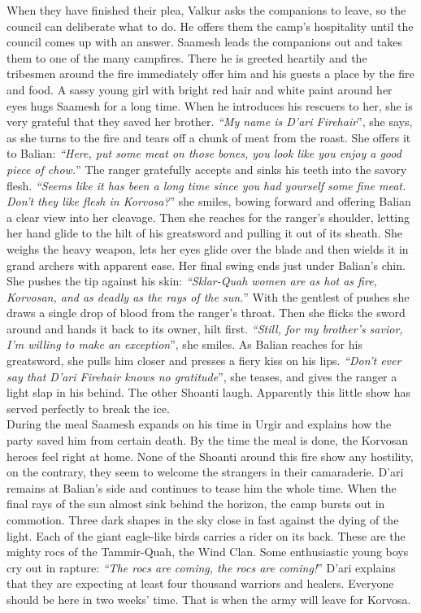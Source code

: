 When they have finished their plea, Valkur asks the companions to leave, so the council can deliberate what to do. He offers them the camp's hospitality until the council comes up with an answer. Saamesh leads the companions out and takes them to one of the many campfires. There he is greeted heartily and the tribesmen around the fire immediately offer him and his guests a place by the fire and food. A sassy young girl with bright red hair and white paint around her eyes hugs Saamesh for a long time. When he introduces his rescuers to her, she is very grateful that they saved her brother. {\itshape``My name is D'ari Firehair}'', she says, as she turns to the fire and tears off a chunk of meat from the roast. She offers it to Balian: {\itshape``Here, put some meat on those bones, you look like you enjoy a good piece of chow.}'' The ranger gratefully accepts and sinks his teeth into the savory flesh. {\itshape``Seems like it has been a long time since you had yourself some fine meat. Don't they like flesh in Korvosa?}'' she smiles, bowing forward and offering Balian a clear view into her cleavage. Then she reaches for the ranger's shoulder, letting her hand glide to the hilt of his greatsword and pulling it out of its sheath. She weighs the heavy weapon, lets her eyes glide over the blade and then wields it in grand archers with apparent ease. Her final swing ends just under Balian's chin. She pushes the tip against his skin: {\itshape``Sklar-Quah women are as hot as fire, Korvosan, and as deadly as the rays of the sun.}'' With the gentlest of pushes she draws a single drop of blood from the ranger's throat. Then she flicks the sword around and hands it back to its owner, hilt first. {\itshape``Still, for my brother's savior, I'm willing to make an exception}'', she smiles. As Balian reaches for his greatsword, she pulls him closer and presses a fiery kiss on his lips. {\itshape``Don't ever say that D'ari Firehair knows no gratitude}'', she teases, and gives the ranger a light slap in his behind. The other Shoanti laugh. Apparently this little show has served perfectly to break the ice.\\

During the meal Saamesh expands on his time in Urgir and explains how the party saved him from certain death. By the time the meal is done, the Korvosan heroes feel right at home. None of the Shoanti around this fire show any hostility, on the contrary, they seem to welcome the strangers in their camaraderie. D'ari remains at Balian's side and continues to tease him the whole time. When the final rays of the sun almost sink behind the horizon, the camp bursts out in commotion. Three dark shapes in the sky close in fast against the dying of the light. Each of the giant eagle-like birds carries a rider on its back. These are the mighty rocs of the Tammir-Quah, the Wind Clan. Some enthusiastic young boys cry out in rapture: {\itshape``The rocs are coming, the rocs are coming!}'' D'ari explains that they are expecting at least four thousand warriors and healers. Everyone should be here in two weeks' time. That is when the army will leave for Korvosa.\\


